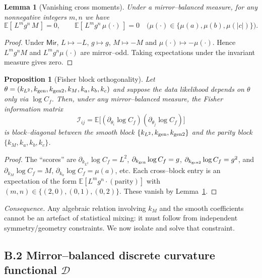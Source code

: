 \documentclass[12pt]{article}
\newtheorem{lemma}[theorem]{Lemma}
\newtheorem{proposition}[theorem]{Proposition}
\numberwithin{equation}{section}
\begin{document}
\begin{lemma}[Vanishing cross moments]\label{lem:vanish}
Under a mirror–balanced measure, for any nonnegative integers $m,n$ we have
\[
\mathbb{E}[\,L^{m} g^{n} \, M\,]=0,\qquad
\mathbb{E}[\,L^{m} g^{n} \, \mu(\cdot)\,]=0\quad \big(\mu(\cdot)\in\{\mu(a),\mu(b),\mu(|c|)\}\big).
\]
\end{lemma}

\begin{proof}
Under $\mathsf{Mir}$, $L\mapsto -L$, $g\mapsto g$, $M\mapsto -M$ and $\mu(\cdot)\mapsto -\mu(\cdot)$.
Hence $L^m g^n M$ and $L^m g^n \mu(\cdot)$ are mirror–odd. Taking expectations under the invariant measure gives zero.
\end{proof}

\begin{proposition}[Fisher block orthogonality]\label{prop:block}
Let $\theta=(k_{L^2},k_{\rm gen},k_{\rm gen2},k_M,k_a,k_b,k_c)$ and suppose the data likelihood depends on $\theta$ only via $\log C_f$.
Then, under any mirror–balanced measure, the Fisher information matrix
\[
\mathcal{I}_{ij}
=\mathbb{E}\big[(\partial_{\theta_i}\log C_f)(\partial_{\theta_j}\log C_f)\big]
\]
is block–diagonal between the smooth block $\{k_{L^2},k_{\rm gen},k_{\rm gen2}\}$ and the parity block $\{k_M,k_a,k_b,k_c\}$.
\end{proposition}

\begin{proof}
The ``scores'' are $\partial_{k_{L^2}}\log C_f=L^2$, $\partial_{k_{\rm gen}}\log C_f=g$, $\partial_{k_{\rm gen2}}\log C_f=g^2$, and
$\partial_{k_M}\log C_f=M$, $\partial_{k_a}\log C_f=\mu(a)$, etc. Each cross–block entry is an expectation of the form
$\mathbb{E}[ L^{m} g^{n} \cdot (\text{parity}) ]$ with $(m,n)\in\{(2,0),(0,1),(0,2)\}$. These vanish by Lemma~\ref{lem:vanish}.
\end{proof}

\noindent
\textit{Consequence.} Any algebraic relation involving $k_M$ and the smooth coefficients cannot be an artefact of statistical mixing: it must follow from independent symmetry/geometry constraints. We now isolate and solve that constraint.

\bigskip
\subsection*{B.2 \; Mirror–balanced discrete curvature functional \texorpdfstring{$\mathcal{D}$}{D}}
\end{document}
